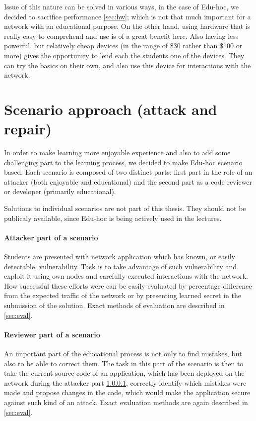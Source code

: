 \documentclass[
  print, %
  Table,   %
  nolof,     %
  nolot,     %
           oneside
]{fithesis3}
\begin{document}
  Issue of this nature can be solved in various ways, in the case of Edu-hoc, we decided to sacrifice performance \ref{sec:hw}; which is not that much important for a network with an educational purpose. On the other hand, using hardware that is really easy to comprehend and use is of a great benefit here. Also having less powerful, but relatively cheap devices (in the range of \$30 rather than \$100 or more) gives the opportunity to lend each the students one of the devices. They can try the basics on their own, and also use this device for interactions with the network.

  \section{Scenario approach (attack and repair)}
  In order to make learning more enjoyable experience and also to add some challenging part to the learning process, we decided to make Edu-hoc scenario based. Each scenario is composed of two distinct parts: first part in the role of an attacker (both enjoyable and educational) and the second part as a code reviewer or developer (primarily educational).

  Solutions to individual scenarios are not part of this thesis. They should not be publicaly available, since Edu-hoc is being actively used in the lectures.

  \paragraph{Attacker part of a scenario}\label{par:att}
    Students are presented with network application which has known, or easily detectable, vulnerability. Task is to take advantage of such vulnerability and exploit it using own nodes and carefully executed interactions with the network. How successful these efforts were can be easily evaluated by percentage difference from the expected traffic of the network or by presenting learned secret in the submission of the solution. Exact methods of evaluation are described in \ref{sec:eval}.

  \paragraph{Reviewer part of a scenario}
    An important part of the educational process is not only to find mistakes, but also to be able to correct them. The task in this part of the scenario is then to take the current source code of an application, which has been deployed on the network during the attacker part \ref{par:att}, correctly identify which mistakes were made and propose changes in the code, which would make the application secure against such kind of an attack. Exact evaluation methods are again described in \ref{sec:eval}.
\end{document}
